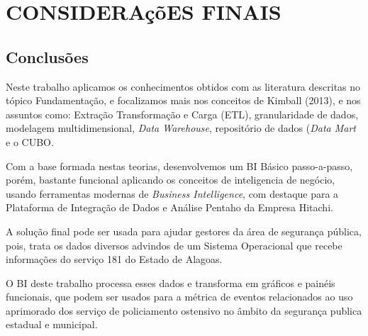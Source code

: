 %
%

\chapter{CONSIDERA\c{c}\~{o}ES FINAIS}


\section{Conclus\~{o}es}



Neste trabalho aplicamos os conhecimentos obtidos com as literatura descritas no t\'{o}pico Fundamenta\c{c}\~{a}o, e focalizamos mais nos conceitos de Kimball (2013), e nos assuntos como: Extra\c{c}\~{a}o Transforma\c{c}\~{a}o e Carga (ETL), granularidade de dados, modelagem multidimensional, \textit{Data Warehouse}, reposit\'{o}rio de dados (\textit{Data Mart} e o CUBO.

Com a base formada nestas teorias, desenvolvemos um BI Básico passo-a-passo, por\'{e}m, bastante funcional aplicando os conceitos de inteligencia de neg\'{o}cio, usando ferramentas modernas de \textit{Business Intelligence}, com destaque para a Plataforma de Integra\c{c}\~{a}o de Dados e Análise Pentaho da Empresa Hitachi.

A solu\c{c}\~{a}o final pode ser usada para ajudar gestores da área de seguran\c{c}a pública, pois, trata os dados diversos advindos de um Sistema Operacional que recebe informa\c{c}\~{o}es do servi\c{c}o 181 do Estado de Alagoas. 

O BI deste trabalho processa esses dados e transforma em gráficos e pain\'{e}is funcionais, que podem ser usados para a m\'{e}trica de eventos relacionados ao uso aprimorado dos servi\c{c}o de policiamento ostensivo no âmbito da seguran\c{c}a publica estadual e municipal.

